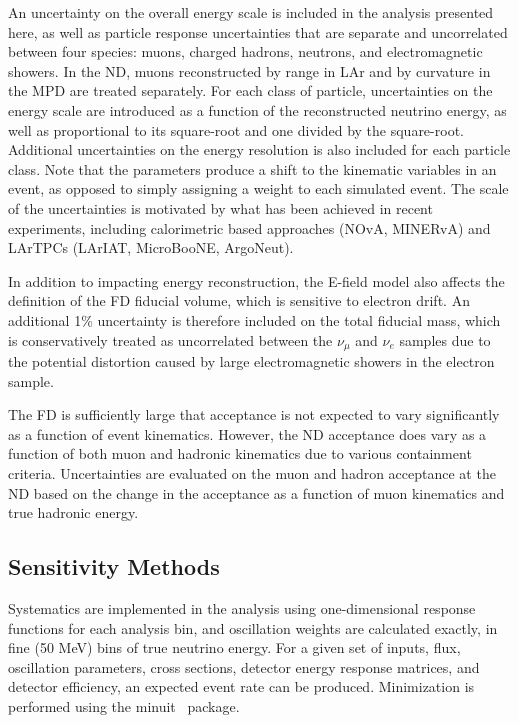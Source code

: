 An uncertainty on the overall energy scale is included in the analysis presented here, as well as particle response uncertainties that are separate and uncorrelated between four species: muons, charged hadrons, neutrons, and electromagnetic showers. In the ND, muons reconstructed by range in LAr and by curvature in the MPD are treated separately. For each class of particle, uncertainties on the energy scale are introduced as a function of the reconstructed neutrino energy, as well as proportional to its square-root and one divided by the square-root. Additional uncertainties on the energy resolution is also included for each particle class. Note that the parameters produce a shift to the kinematic variables in an event, as opposed to simply assigning a weight to each simulated event. The scale of the uncertainties is motivated by what has been achieved in recent experiments, including calorimetric based approaches (NOvA, MINERvA) and LArTPCs (LArIAT, MicroBooNE, ArgoNeut).

In addition to impacting energy reconstruction, the E-field model also affects the definition of the FD fiducial volume, which is sensitive to electron drift. An additional 1\% uncertainty is therefore included on the total fiducial mass, which is conservatively treated as uncorrelated between the $\nu_{\mu}$ and $\nu_{e}$ samples due to the potential distortion caused by large electromagnetic showers in the electron sample.

The FD is sufficiently large that acceptance is not expected to vary significantly as a function of event kinematics. However, the ND acceptance does vary as a function of both muon and hadronic kinematics due to various containment criteria. Uncertainties are evaluated on the muon and hadron acceptance at the ND based on the change in the acceptance as a function of muon kinematics and true hadronic energy.

\subsection{Sensitivity Methods}
Systematics are implemented in the analysis using one-dimensional response functions for each analysis bin, and oscillation weights are calculated exactly, in fine (50 MeV) bins of true neutrino energy. For a given set of inputs, flux, oscillation parameters, cross sections, detector energy response matrices, and detector efficiency, an expected event rate can be produced. Minimization is performed using the {\sc minuit}~\cite{James:1994vla} package.

